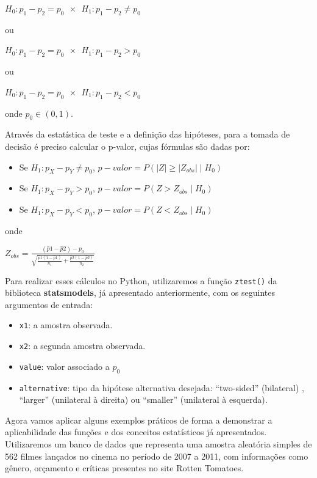 \documentclass[
  letterpaper,
  DIV=11,
  numbers=noendperiod]{scrreprt}
\providecommand{\tightlist}{%
  \setlength{\itemsep}{0pt}\setlength{\parskip}{0pt}}\usepackage{longtable,booktabs,array}
\begin{document}
\(H_{0}: p_{1} - p_{2} = p_{0} \ \ \times \ \ H_{1}: p_{1} - p_{2} \neq p_{0}\)

ou

\(H_{0}: p_{1} - p_{2} = p_{0} \ \ \times \ \ H_{1}: p_{1} - p_{2} > p_{0}\)

ou

\(H_{0}: p_{1} - p_{2} = p_{0} \ \ \times \ \ H_{1}: p_{1} - p_{2} < p_{0}\)

onde \(p_0 \in (0,1)\).

Através da estatística de teste e a definição das hipóteses, para a
tomada de decisão é preciso calcular o p-valor, cujas fórmulas são dadas
por:

\begin{itemize}
\item
  Se \(H_{1} : p_{X} - p_{Y}\neq p_{0}\),
  \(p-valor = P(|Z| \geq \left | Z_{obs} \right |\mid H_{0})\)
\item
  Se \(H_{1} : p_{X} - p_{Y} > p_{0}\),
  \(p-valor = P(Z > Z_{obs}\mid H_{0} )\)
\item
  Se \(H_{1} : p_{X} - p_{Y} < p_{0}\),
  \(p-valor = P(Z < Z_{obs}\mid H_{0} )\)
\end{itemize}

onde

\(Z_{obs} = \frac{(\hat{p}{1} - \hat{p}{2}) - p_{0}}{\sqrt{\frac{\hat{p}{1}(1 - \hat{p}{1})}{n_{1}} + \frac{\hat{p}{2}(1 - \hat{p}{2})}{n_{2}}}}\)

Para realizar esses cálculos no Python, utilizaremos a função
\texttt{ztest()} da biblioteca \textbf{statsmodels}, já apresentado
anteriormente, com os seguintes argumentos de entrada:

\begin{itemize}
\tightlist
\item
  \texttt{x1}: a amostra observada.
\item
  \texttt{x2}: a segunda amostra observada.
\item
  \texttt{value}: valor associado a \(p_{0}\)
\item
  \texttt{alternative}: tipo da hipótese alternativa desejada:
  ``two-sided'' (bilateral) , ``larger'' (unilateral à direita) ou
  ``smaller'' (unilateral à esquerda).
\end{itemize}

Agora vamos aplicar alguns exemplos práticos de forma a demonstrar a
aplicabilidade das funções e dos conceitos estatísticos já apresentados.
Utilizaremos um banco de dados que representa uma amostra aleatória
simples de 562 filmes lançados no cinema no período de 2007 a 2011, com
informações como gênero, orçamento e críticas presentes no site Rotten
Tomatoes.
\end{document}
